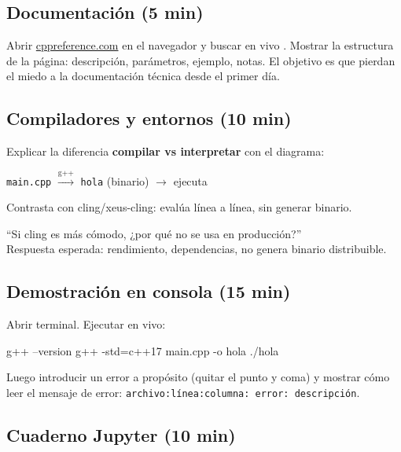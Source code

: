 \documentclass[12pt, oneside]{article}
\begin{document}
\subsection{Documentación (5 min)}

Abrir \href{https://en.cppreference.com}{cppreference.com} en el navegador y
buscar en vivo . Mostrar la estructura de la página: descripción,
parámetros, ejemplo, notas. El objetivo es que pierdan el miedo a la documentación
técnica desde el primer día.

\subsection{Compiladores y entornos (10 min)}

Explicar la diferencia \textbf{compilar vs interpretar} con el diagrama:

\begin{center}
  \texttt{main.cpp} $\xrightarrow{\text{g++}}$ \texttt{hola} (binario) $\xrightarrow{}$ ejecuta
\end{center}

Contrasta con cling/xeus-cling: evalúa línea a línea, sin generar binario.

\begin{notaprofesor}
  ``Si cling es más cómodo, ¿por qué no se usa en producción?''\\
  Respuesta esperada: rendimiento, dependencias, no genera binario distribuible.
\end{notaprofesor}

\subsection{Demostración en consola (15 min)}

Abrir terminal. Ejecutar en vivo:

\begin{codigo}[language=bash, numbers=none]
g++ --version
g++ -std=c++17 main.cpp -o hola
./hola
\end{codigo}

Luego introducir un error a propósito (quitar el punto y coma) y mostrar cómo
leer el mensaje de error: \texttt{archivo:línea:columna: error: descripción}.

\subsection{Cuaderno Jupyter (10 min)}
\end{document}
